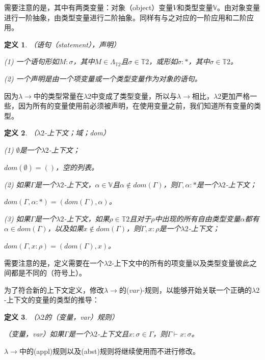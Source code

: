 \documentclass[UTF8]{article}
\newtheorem{thm}{定义}[section]
\begin{document}
		需要注意的是，其中有两类变量：对象（object）变量$V$和类型变量$\mathbb{V}$。由对象变量进行一阶抽象，由类型变量进行二阶抽象。同样有与之对应的一阶应用和二阶应用。
		
		\begin{thm}（语句（statement），声明）
			
			(1) 一个语句形如$M:\sigma$，其中$M\in\Lambda_{\mathbb{T}2}$且$\sigma\in\mathbb{T}2$，或形如$\sigma:*$，其中$\sigma\in\mathbb{T}2$。
			
			(2) 一个声明是由一个项变量或一个类型变量作为对象的语句。
		\end{thm}
		
		因为$\lambda{\rightarrow}$中的类型常量在$\lambda{2}$中变成了类型变量，所以与$\lambda{\rightarrow}$相比，$\lambda{2}$更加严格一些，因为所有的变量使用前必须被声明，在使用变量之前，我们知道所有变量的类型。
		
		\begin{thm}（$\lambda{2}$-上下文；域；dom）
			
			(1) $\emptyset$是一个$\lambda{2}$-上下文；
			
			$dom(\emptyset) = ()$，空的列表。
			
			(2) 如果$\Gamma$是一个$\lambda{2}$-上下文，$\alpha\in\mathbb{V}$且$\alpha\notin dom(\Gamma)$，则$\Gamma,\alpha:*$是一个$\lambda{2}$-上下文；
			
			$dom(\Gamma,\alpha:*)=(dom(\Gamma),\alpha)$。
			
			(3) 如果$\Gamma$是一个$\lambda{2}$-上下文，如果$\rho\in\mathbb{T}2$且对于$\rho$中出现的所有自由类型变量$\alpha$都有$\alpha\in dom(\Gamma)$，以及如果$x\notin dom(\Gamma)$，则$\Gamma,x:\rho$是一个$\lambda{2}$-上下文；
			
			$dom(\Gamma,x:\rho)=(dom(\Gamma),x)$。
		\end{thm}
	
		需要注意的是，定义需要在一个$\lambda{2}$-上下文中的所有的项变量以及类型变量彼此之间都是不同的（符号上）。
		
		为了符合新的上下文定义，修改$\lambda{\rightarrow}$的($var$)-规则，以能够开始关联一个正确的$\lambda{2}$-上下文的变量的类型的推导：
		
		\begin{thm} （$\lambda{2}$的（变量，var）规则）
			
			（变量，var）如果$\Gamma$是一个$\lambda{2}$-上下文且$x:\sigma\in\Gamma$，则$\Gamma\vdash x:\sigma$。
		\end{thm}
	
		$\lambda{\rightarrow}$中的(appl)规则以及(abst)规则将继续使用而不进行修改。
		
\end{document}
